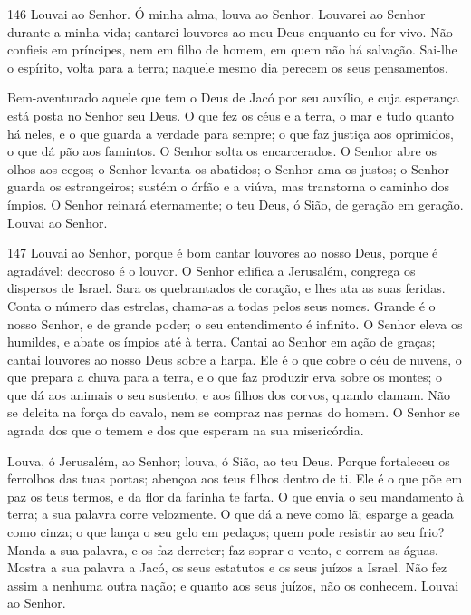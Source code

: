 \bigskip

\lettrine{146}{} Louvai ao Senhor. Ó minha alma, louva ao
Senhor. Louvarei ao Senhor durante a minha vida; cantarei
louvores ao meu Deus enquanto eu for vivo. Não confieis em
príncipes, nem em filho de homem, em quem não há salvação.
Sai-lhe o espírito, volta para a terra; naquele mesmo dia
perecem os seus pensamentos.

Bem-aventurado aquele que tem o Deus de Jacó por seu auxílio, e
cuja esperança está posta no Senhor seu Deus. O que fez os céus
e a terra, o mar e tudo quanto há neles, e o que guarda a verdade
para sempre; o que faz justiça aos oprimidos, o que dá pão aos
famintos. O Senhor solta os encarcerados. O Senhor abre os olhos
aos cegos; o Senhor levanta os abatidos; o Senhor ama os justos;
o Senhor guarda os estrangeiros; sustém o órfão e a viúva, mas
transtorna o caminho dos ímpios. O Senhor reinará
eternamente; o teu Deus, ó Sião, de geração em geração. Louvai ao
Senhor.

\bigskip

\lettrine{147}{} Louvai ao Senhor, porque é bom cantar louvores
ao nosso Deus, porque é agradável; decoroso é o louvor. O Senhor
edifica a Jerusalém, congrega os dispersos de Israel. Sara os
quebrantados de coração, e lhes ata as suas feridas. Conta o
número das estrelas, chama-as a todas pelos seus nomes. Grande é
o nosso Senhor, e de grande poder; o seu entendimento é infinito.
O Senhor eleva os humildes, e abate os ímpios até à terra.
Cantai ao Senhor em ação de graças; cantai louvores ao nosso
Deus sobre a harpa. Ele é o que cobre o céu de nuvens, o que
prepara a chuva para a terra, e o que faz produzir erva sobre os
montes; o que dá aos animais o seu sustento, e aos filhos dos
corvos, quando clamam. Não se deleita na força do cavalo, nem
se compraz nas pernas do homem. O Senhor se agrada dos que o
temem e dos que esperam na sua misericórdia.

Louva, ó Jerusalém, ao Senhor; louva, ó Sião, ao teu Deus.
Porque fortaleceu os ferrolhos das tuas portas; abençoa aos
teus filhos dentro de ti. Ele é o que põe em paz os teus
termos, e da flor da farinha te farta. O que envia o seu
mandamento à terra; a sua palavra corre velozmente. O que dá
a neve como lã; esparge a geada como cinza; o que lança o seu
gelo em pedaços; quem pode resistir ao seu frio? Manda a sua
palavra, e os faz derreter; faz soprar o vento, e correm as águas.
Mostra a sua palavra a Jacó, os seus estatutos e os seus
juízos a Israel. Não fez assim a nenhuma outra nação; e
quanto aos seus juízos, não os conhecem. Louvai ao Senhor.


